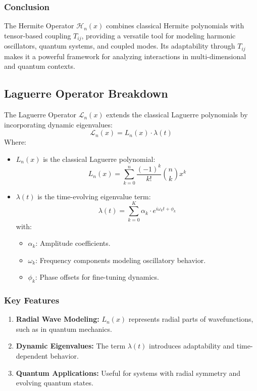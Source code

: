 \documentclass{article}
\theoremstyle{plain}
\begin{document}
\subsubsection*{Conclusion}
The Hermite Operator \( \mathcal{H}_n(x) \) combines classical Hermite polynomials with tensor-based coupling \( T_{ij} \), providing a versatile tool for modeling harmonic oscillators, quantum systems, and coupled modes. Its adaptability through \( T_{ij} \) makes it a powerful framework for analyzing interactions in multi-dimensional and quantum contexts.


\subsection{Laguerre Operator Breakdown}

The Laguerre Operator \( \mathcal{L}_n(x) \) extends the classical Laguerre polynomials by incorporating dynamic eigenvalues:
\[
\mathcal{L}_n(x) = L_n(x) \cdot \lambda(t)
\]
Where:
\begin{itemize}
    \item \( L_n(x) \) is the classical Laguerre polynomial:
    \[
    L_n(x) = \sum_{k=0}^n \frac{(-1)^k}{k!} \binom{n}{k} x^k
    \]
    \item \( \lambda(t) \) is the time-evolving eigenvalue term:
    \[
    \lambda(t) = \sum_{k=0}^K \alpha_k \cdot e^{i\omega_k t + \phi_k}
    \]
    with:
    \begin{itemize}
        \item \( \alpha_k \): Amplitude coefficients.
        \item \( \omega_k \): Frequency components modeling oscillatory behavior.
        \item \( \phi_k \): Phase offsets for fine-tuning dynamics.
    \end{itemize}
\end{itemize}

\subsubsection*{Key Features}
\begin{enumerate}
    \item \textbf{Radial Wave Modeling:} \( L_n(x) \) represents radial parts of wavefunctions, such as in quantum mechanics.
    \item \textbf{Dynamic Eigenvalues:} The term \( \lambda(t) \) introduces adaptability and time-dependent behavior.
    \item \textbf{Quantum Applications:} Useful for systems with radial symmetry and evolving quantum states.
\end{enumerate}
\end{document}
